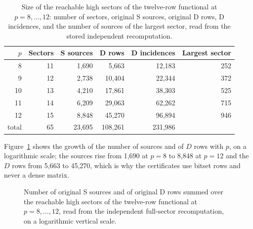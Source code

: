 \documentclass[11pt]{article}
\theoremstyle{definition}
\theoremstyle{remark}
\begin{document}
\begin{table}[t]
\centering\small
\begin{tabular}{rrrrrr}
\toprule
$p$ & Sectors & S sources & D rows & D incidences & Largest sector\\
\midrule
8 & 11 & 1,690 & 5,663 & 12,183 & 252\\
9 & 12 & 2,738 & 10,404 & 22,344 & 372\\
10 & 13 & 4,210 & 17,861 & 38,303 & 525\\
11 & 14 & 6,209 & 29,063 & 62,262 & 715\\
12 & 15 & 8,848 & 45,270 & 96,894 & 946\\
\midrule
total & 65 & 23,695 & 108,261 & 231,986 & \\
\bottomrule
\end{tabular}
\caption{Size of the reachable high sectors of the twelve-row functional at $p=8,\ldots,12$: number of sectors, original S
sources, original D rows, D incidences, and the number of sources of the largest sector, read from the stored independent
recomputation.}
\label{tab:sectors}
\end{table}

Figure~\ref{fig:sectorsize} shows the growth of the number of sources and of $D$ rows with $p$, on a logarithmic scale; the sources rise from 1,690 at $p=8$ to 8,848 at $p=12$ and the $D$ rows from 5,663 to 45,270, which is why the certificates use bitset rows and never a dense matrix.

\begin{figure}[t]
\centering
{}
\caption{Number of original S sources and of original D rows summed over the reachable high sectors of the twelve-row functional at $p=8,\ldots,12$, read from the independent full-sector recomputation, on a logarithmic vertical scale.}
\label{fig:sectorsize}
\end{figure}
\end{document}
